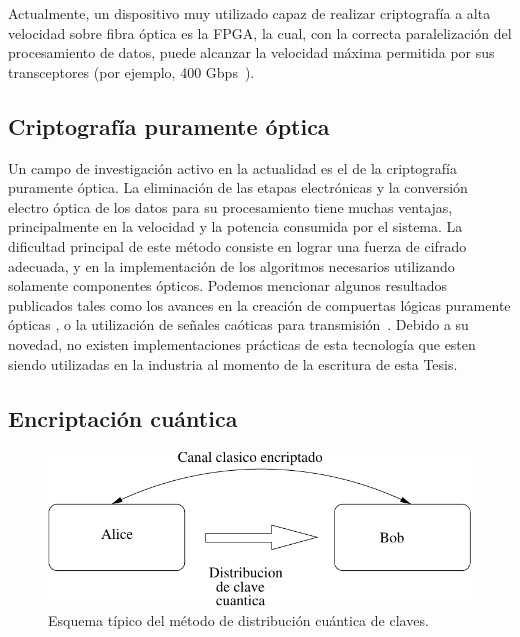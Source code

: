 Actualmente, un dispositivo muy utilizado capaz de realizar criptografía a alta velocidad sobre fibra óptica es la FPGA, la cual, con la correcta paralelización del procesamiento de datos, puede alcanzar la velocidad máxima permitida por sus transceptores (por ejemplo, 400 Gbps~\cite{Algotronix}).

\subsection{Criptografía puramente óptica}
\label{optocry}
Un campo de investigación activo en la actualidad es el de la criptografía puramente óptica. La eliminación de las etapas electrónicas y la conversión electro óptica de los datos para su procesamiento tiene muchas ventajas, principalmente en la velocidad y la potencia consumida por el sistema.
La dificultad principal de este método consiste en lograr una fuerza de cifrado adecuada, y en la implementación de los algoritmos necesarios utilizando solamente componentes ópticos. Podemos mencionar algunos resultados publicados tales como los avances en la creación de compuertas lógicas puramente ópticas \cite{jung2008demonstration}, o la utilización de señales caóticas para transmisión~\cite{liu2002synchronized}.
Debido a su novedad, no existen implementaciones prácticas de esta tecnología que esten siendo utilizadas en la industria al momento de la escritura de esta Tesis.


\subsection{Encriptación cuántica}

\begin{figure}[t]
  \centering
  \includegraphics[width=0.7 \textwidth]{graphs/quantum} 
  \caption{Esquema típico del método de distribución cuántica de claves.}
  \label{fig_quant}
\end{figure}


